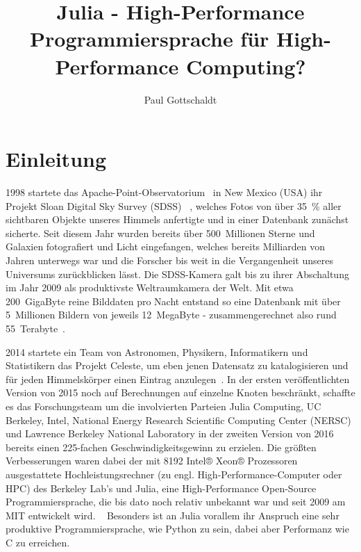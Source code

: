 \documentclass[proseminar,german,utf8]{zihpub}
\author{Paul Gottschaldt}
\title{Julia - High-Performance Programmiersprache für High-Performance Computing?}
\begin{document}
\section {Einleitung}
1998 startete das Apache-Point-Observatorium~\cite{APOWiki} in New Mexico (USA) ihr Projekt Sloan Digital Sky Survey (SDSS)~\cite{SDSSWiki} \cite{SDSSIII}, welches Fotos von über 35~\% aller sichtbaren Objekte unseres Himmels anfertigte und in einer Datenbank zunächst sicherte. Seit diesem Jahr wurden bereits über 500~Millionen Sterne und Galaxien fotografiert und Licht eingefangen, welches bereits Milliarden von Jahren unterwegs war und die Forscher bis weit in die Vergangenheit unseres Universums zurückblicken lässt. Die SDSS-Kamera galt bis zu ihrer Abschaltung im Jahr 2009 als produktivste Weltraumkamera der Welt. Mit etwa 200~GigaByte reine Bilddaten pro Nacht entstand so eine Datenbank mit über 5~Millionen Bildern von jeweils 12~MegaByte - zusammengerechnet also rund 55~Terabyte~\cite{CelesteV2}.

 2014 startete ein Team von Astronomen, Physikern, Informatikern und Statistikern das Projekt Celeste, um eben jenen Datensatz zu katalogisieren und für jeden Himmelskörper einen Eintrag anzulegen~\cite{CelesteV3}. In der ersten veröffentlichten Version von 2015 noch auf Berechnungen auf einzelne Knoten beschränkt, schaffte es das Forschungsteam um die involvierten Parteien Julia Computing, UC Berkeley, Intel, National Energy Research Scientific Computing Center (NERSC) und Lawrence Berkeley National Laboratory in der zweiten Version von 2016 bereits einen 225-fachen Geschwindigkeitsgewinn zu erzielen. Die größten Verbesserungen waren dabei der mit 8192 Intel® Xeon® Prozessoren ausgestattete Hochleistungsrechner (zu engl. High-Performance-Computer oder HPC) des Berkeley Lab's und Julia, eine High-Performance Open-Source Programmiersprache, die bis dato noch relativ unbekannt war und seit 2009 am MIT entwickelt wird. ~\cite{CelesteHeise} \cite{CelesteVideo} Besonders ist an Julia vorallem ihr Anspruch eine sehr produktive Programmiersprache, wie Python zu sein, dabei aber Performanz wie C zu erreichen.
\end{document}
